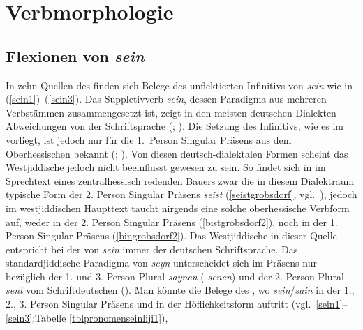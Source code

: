 	 
     
     


 
 
  \section{Verbmorphologie}\label{verbscheiße} 
 \subsection{Flexionen von \textit{sein}}\label{sein}

 In zehn Quellen des  finden sich Belege des unflektierten Infinitivs von \textit{sein} wie in (\ref{sein1})–(\ref{sein3}).  Das Suppletivverb \textit{sein}, dessen Paradigma aus mehreren Verbstämmen zusammengesetzt ist, zeigt in den meisten deutschen Dialekten Abweichungen von der Schriftsprache (\citealt[571–574]{Schirmunski1962}; \citealt{Nuebling2000}). Die Setzung des Infinitivs, wie es im  vorliegt, ist jedoch nur für die \mbox{1. Person} Singular Präsens aus dem Oberhessischen bekannt (\citealt[572]{Schirmunski1962}; \citealt[93]{Friebertshaeuser1987}). Von diesen deutsch-dialektalen Formen scheint das Westjiddische jedoch nicht beeinflusst gewesen zu sein. So findet sich in  im Sprechtext eines zentralhessisch redenden Bauers zwar die in diesem Dialektraum typische Form der 2. Person Singular Präsens \textit{seist} (\ref{seistgrobsdorf}, vgl.\, \citealt[93]{Friebertshaeuser1987}), jedoch im westjiddischen Haupttext taucht nirgends eine solche oberhessische Verbform auf, weder in der 2. Person Singular Präsens (\ref{bistgrobsdorf2}), noch in der 1. Person Singular Präsens (\ref{bingrobsdorf2}). Das Westjiddische in dieser Quelle entspricht bei der  von \textit{sein} immer der deutschen Schriftsprache. Das standardjiddische Paradigma von  \textit{seyn} unterscheidet sich im Präsens nur bezüglich der 1. und 3. Person Plural  \textit{saynen} (\hai{{\ZOJ}}  \textit{senen})  und der 2. Person Plural  \textit{sent}  vom Schriftdeutschen (\citealt[216]{Jacobs2005}). Man könnte die Belege des , wo \textit{sein}/\textit{sain} in der 1., 2., 3. Person Singular Präsens und in der Höflichkeitsform auftritt (vgl.\, \ref{sein1}–\ref{sein3};Tabelle \ref{tblpronomenseinliji1}), \,%

